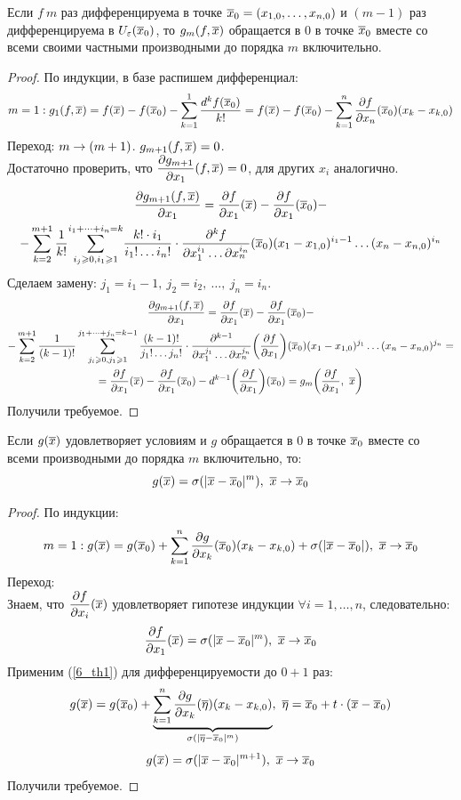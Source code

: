 \begin{lemma}\label{6_le1}
	Если $f\ m$ раз дифференцируема в точке $\overline x_0=(x_{1,0},\dots,x_{n,0})$ и $(m-1)$ раз дифференцируема в $U_\varepsilon(\overline x_0)$, то $g_m(f,\overline x)$ обращается в $0$ в точке $\overline x_0$ вместе со всеми своими частными производными до порядка $m$ включительно.
\end{lemma}
\begin{proof}
	По индукции, в базе распишем дифференциал: 
	\[m=1:g_1(f,\vx)=f(\vx)-f(\vx_0)-\sum^1_{k=1}\frac{d^kf(\vx_0)}{k!}=f(\vx)-f(\vx_0)-\sum_{k=1}^n\frac{\vd f}{\vd x_n}(\vx_0)(x_k-x_{k,0})\]
	Переход: $m\rightarrow (m+1)$. $g_{m+1}(f,\overline x)=0$.\\[0.1cm]
	Достаточно проверить, что $\displaystyle\frac{\partial g_{m+1}}{\partial x_1}(f,\overline x)=0$, для других $x_i$ аналогично.
	\begin{multline*}
		\frac{\vd g_{m+1}(f,\vx)}{\vd x_1}=\frac{\vd f}{\vd x_1}(\vx)-\frac{\vd f}{\vd x_1}(\vx_0)-\\
		-\sum_{k=2}^{m+1}\frac{1}{k!}{\sum_{i_j\ge0,i_1\ge1}^{i_1+\dots+i_n=k}}\frac{k!\cdot i_1}{i_1!\dots i_n!}\cdot\frac{\vd^kf}{\vd x_1^{i_1}\dots\vd x_n^{i_n}}(\vx_0)(x_1-x_{1,0})^{i_1-1}\dots(x_n-x_{n,0})^{i_n}
	\end{multline*}
	Сделаем замену: $j_1=i_1-1,\ j_2=i_2,\ \dots,\ j_n=i_n$.
	\begin{multline*}
		\frac{\vd g_{m+1}(f,\vx)}{\vd x_1}=\frac{\vd f}{\vd x_1}(\v x)-\frac{\vd f}{\vd x_1}(\vx_0)-\\
		-\sum_{k=2}^{m+1}\frac{1}{(k-1)!}
		\sum_{j_i\ge0,j_1\ge1}^{j_1+\dots+j_n=k-1}\frac{(k-1)!}{j_1!\dots j_n!}\cdot\frac{\vd^{k-1}}{\vd x_1^{j_1}\dots\vd x_n^{j_n}}\bigg(\frac{\vd f}{\vd x_1}\bigg)(\vx_0)(x_1-x_{1,0})^{j_1}\dots(x_n-x_{n,0})^{j_n}=\\
		=\frac{\vd f}{\vd x_1}(\v x)-\frac{\vd f}{\vd x_1}(\vx_0)-d^{k-1}\bigg(\frac{\vd f}{\vd x_1}\bigg)(\vx_0)=g_m\bigg(\frac{\vd f}{\vd x_1},\ \vx\bigg)
	\end{multline*}
	Получили требуемое.
\end{proof}
\begin{lemma}\label{6_le2}
	Если $g(\overline x)$ удовлетворяет условиям \nf{(\ref{6_le1})} и $g$ обращается в $0$ в точке $\overline x_0$ вместе со всеми производными до порядка $m$ включительно, то:
	\[g(\vx)=\sigma(|\vx-\vx_0|^m),\ \vx\ra\vx_0\]
\end{lemma}
\begin{proof}
	По индукции: 
	\[m=1:g(\vx)=g(\vx_0)+\sum_{k=1}^n\frac{\vd g}{\vd x_k}(\vx_0)(x_k-x_{k,0})+\sigma(|\vx-\vx_0|),\ \vx\ra\vx_0\]
	Переход:\\
	Знаем, что $\displaystyle\frac{\partial f}{\partial x_i}(\overline x)$ удовлетворяет гипотезе индукции $\forall i=1,\dots,n$, следовательно:
	\[\frac{\partial f}{\partial x_1}(\overline x)=\sigma(|\overline x-\overline x_0|^m),\ \overline x\rightarrow\overline x_0\]
	Применим (\ref{6_th1}) для дифференцируемости до $0+1$ раз:
	\[g(\vx)=g(\vx_0)+\underbrace{\sum_{k=1}^n\frac{\vd g}{\vd x_k}(\v\eta)(x_k-x_{k,0})}_{\sigma(|\v\eta-\vx_0|^m)},\ \v\eta=\vx_0+t\cdot(\vx-\vx_0)\]
	\[g(\vx)=\sigma(|\vx-\vx_0|^{m+1}),\ \vx\ra\vx_0\]
	Получили требуемое.
\end{proof}
